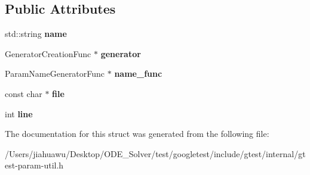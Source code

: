 \subsection*{Public Attributes}
\begin{DoxyCompactItemize}
\item 
\mbox{\label{structtesting_1_1internal_1_1_parameterized_test_case_info_1_1_instantiation_info_a299bc66e22b5c78481fda01ef5a4c73d}} 
std\+::string {\bfseries name}
\item 
\mbox{\label{structtesting_1_1internal_1_1_parameterized_test_case_info_1_1_instantiation_info_a4c2dbdd0c8f50ff2d5c58c72b364e9a0}} 
Generator\+Creation\+Func $\ast$ {\bfseries generator}
\item 
\mbox{\label{structtesting_1_1internal_1_1_parameterized_test_case_info_1_1_instantiation_info_a78a1508dbcc1718bd3dc6001f45ae2ae}} 
Param\+Name\+Generator\+Func $\ast$ {\bfseries name\+\_\+func}
\item 
\mbox{\label{structtesting_1_1internal_1_1_parameterized_test_case_info_1_1_instantiation_info_a2e8aabfbee50377662389fc609222dc4}} 
const char $\ast$ {\bfseries file}
\item 
\mbox{\label{structtesting_1_1internal_1_1_parameterized_test_case_info_1_1_instantiation_info_af3f6efd51f0047a3d1f649504c1f3fa1}} 
int {\bfseries line}
\end{DoxyCompactItemize}


The documentation for this struct was generated from the following file\+:\begin{DoxyCompactItemize}
\item 
/\+Users/jiahuawu/\+Desktop/\+O\+D\+E\+\_\+\+Solver/test/googletest/include/gtest/internal/gtest-\/param-\/util.\+h\end{DoxyCompactItemize}
